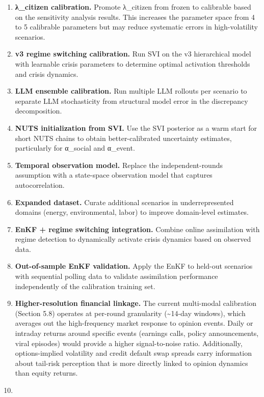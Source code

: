 \documentclass[
]{article}
\begin{document}
\begin{enumerate}
\def\labelenumi{\arabic{enumi}.}
\item
  \textbf{λ\_citizen calibration.} Promote λ\_citizen from frozen to
  calibrable based on the sensitivity analysis results. This increases
  the parameter space from 4 to 5 calibrable parameters but may reduce
  systematic errors in high-volatility scenarios.
\item
  \textbf{v3 regime switching calibration.} Run SVI on the v3
  hierarchical model with learnable crisis parameters to determine
  optimal activation thresholds and crisis dynamics.
\item
  \textbf{LLM ensemble calibration.} Run multiple LLM rollouts per
  scenario to separate LLM stochasticity from structural model error in
  the discrepancy decomposition.
\item
  \textbf{NUTS initialization from SVI.} Use the SVI posterior as a warm
  start for short NUTS chains to obtain better-calibrated uncertainty
  estimates, particularly for α\_social and α\_event.
\item
  \textbf{Temporal observation model.} Replace the independent-rounds
  assumption with a state-space observation model that captures
  autocorrelation.
\item
  \textbf{Expanded dataset.} Curate additional scenarios in
  underrepresented domains (energy, environmental, labor) to improve
  domain-level estimates.
\item
  \textbf{EnKF + regime switching integration.} Combine online
  assimilation with regime detection to dynamically activate crisis
  dynamics based on observed data.
\item
  \textbf{Out-of-sample EnKF validation.} Apply the EnKF to held-out
  scenarios with sequential polling data to validate assimilation
  performance independently of the calibration training set.
\item
  \textbf{Higher-resolution financial linkage.} The current multi-modal
  calibration (Section 5.8) operates at per-round granularity
  (\textasciitilde14-day windows), which averages out the high-frequency
  market response to opinion events. Daily or intraday returns around
  specific events (earnings calls, policy announcements, viral episodes)
  would provide a higher signal-to-noise ratio. Additionally,
  options-implied volatility and credit default swap spreads carry
  information about tail-risk perception that is more directly linked to
  opinion dynamics than equity returns.
\item

\end{enumerate}
\end{document}
